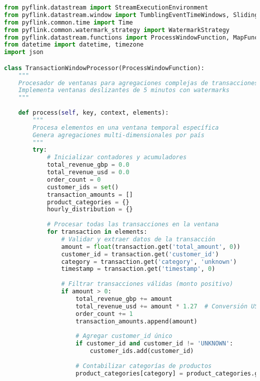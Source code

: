 \begin{lstlisting}[language=python, caption=Implementación de Procesamiento por Ventanas en PyFlink, label=lst:flink_windowing]
from pyflink.datastream import StreamExecutionEnvironment
from pyflink.datastream.window import TumblingEventTimeWindows, SlidingEventTimeWindows
from pyflink.common.time import Time
from pyflink.common.watermark_strategy import WatermarkStrategy
from pyflink.datastream.functions import ProcessWindowFunction, MapFunction
from datetime import datetime, timezone
import json

class TransactionWindowProcessor(ProcessWindowFunction):
    """
    Procesador de ventanas para agregaciones complejas de transacciones
    Implementa ventanas deslizantes de 5 minutos con watermarks
    """
    
    def process(self, key, context, elements):
        """
        Procesa elementos en una ventana temporal específica
        Genera agregaciones multi-dimensionales por país
        """
        try:
            # Inicializar contadores y acumuladores
            total_revenue_gbp = 0.0
            total_revenue_usd = 0.0
            order_count = 0
            customer_ids = set()
            transaction_amounts = []
            product_categories = {}
            hourly_distribution = {}
            
            # Procesar todas las transacciones en la ventana
            for transaction in elements:
                # Validar y extraer datos de la transacción
                amount = float(transaction.get('total_amount', 0))
                customer_id = transaction.get('customer_id')
                category = transaction.get('category', 'unknown')
                timestamp = transaction.get('timestamp', 0)
                
                # Filtrar transacciones válidas (monto positivo)
                if amount > 0:
                    total_revenue_gbp += amount
                    total_revenue_usd += amount * 1.27  # Conversión USD
                    order_count += 1
                    transaction_amounts.append(amount)
                    
                    # Agregar customer_id único
                    if customer_id and customer_id != 'UNKNOWN':
                        customer_ids.add(customer_id)
                    
                    # Contabilizar categorías de productos
                    product_categories[category] = product_categories.get(category, 0) + 1
                    

\end{lstlisting}

